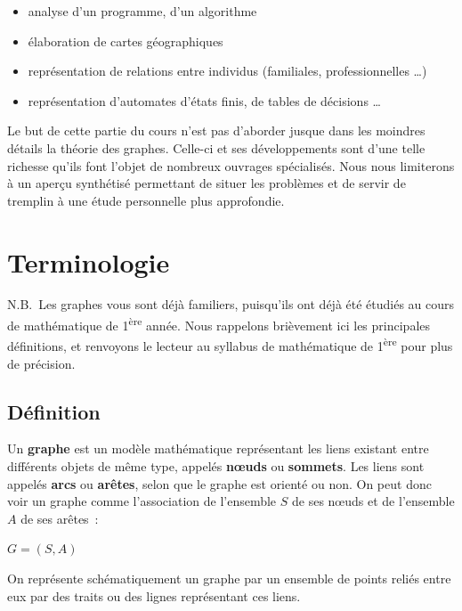 	\begin{itemize}
		\item {
			analyse d'un programme, d'un algorithme}
		\item {
			élaboration de cartes géographiques}
		\item {
			représentation de relations entre individus (familiales, professionnelles {\dots})}
		\item {
			représentation d'automates d'états finis, de tables de décisions {\dots}}
	\end{itemize}
	
	Le but de cette partie du cours n'est pas d'aborder jusque 
	dans les moindres détails la théorie des graphes. Celle-ci et
	ses développements sont d'une telle richesse qu'ils font 
	l'objet de nombreux ouvrages spécialisés. Nous nous limiterons
	à un aperçu synthétisé permettant de situer les problèmes et de 
	servir de tremplin à une étude personnelle plus approfondie.

\section{Terminologie}

	N.B.~Les graphes vous sont déjà familiers, puisqu'ils 
	ont déjà été étudiés au cours de mathématique de
	1\textsuperscript{ère} année. Nous rappelons brièvement 
	ici les principales définitions, et renvoyons le lecteur au
	syllabus de mathématique de 1\textsuperscript{ère} 
	pour plus de précision.

	\subsection{Définition}

		Un \textbf{graphe} est un modèle mathématique représentant 
		les liens existant entre différents objets de même type,
		appelés \textbf{n{\oe}uds} ou \textbf{sommets}. Les liens 
		sont appelés \textbf{arcs} ou \textbf{arêtes}, selon que le
		graphe est orienté ou non. On peut donc voir un graphe comme 
		l'association de l'ensemble $S$ de ses n{\oe}uds et de
		l'ensemble $A$ de ses arêtes~:

		\begin{center}
			$G = (S, A)$
		\end{center}


		On représente schématiquement un graphe par un ensemble de 
		points reliés entre eux par des traits ou des lignes
		représentant ces liens.

